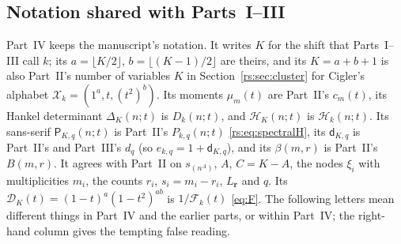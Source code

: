 \documentclass[11pt]{article}
\theoremstyle{definition}
\theoremstyle{remark}
\newcommand{\Ht}{\mathcal H}
\newcommand{\F}{\mathcal F}
\newcommand{\XX}{\mathcal X}
\newcommand{\Den}{\mathcal D}
\newcommand{\Pblock}{\mathsf P}
\newcommand{\dq}{\mathsf d}
\theoremstyle{definition}
\theoremstyle{plain}
\numberwithin{equation}{section}
\begin{document}
\subsection{Notation shared with Parts~I--III}
\label{sb:sec:notation}
Part~IV keeps the manuscript's notation. It writes $K$ for the shift that
Parts~I--III call $k$; its $a=\lfloor K/2\rfloor$, $b=\lfloor(K-1)/2\rfloor$
are theirs, and its $K=a+b+1$ is also Part~II's number of variables $K$ in
Section~\ref{rs:sec:cluster} for Cigler's alphabet $\XX_k=(1^a,t,(t^2)^b)$.
Its moments $\mu_m(t)$ are Part~II's $c_m(t)$, its Hankel determinant
$\Delta_K(n;t)$ is $D_k(n;t)$, and $\Ht_K(n;t)$ is $\Ht_k(n;t)$. Its
sans-serif $\Pblock_{K,q}(n;t)$ is Part~II's $P_{k,q}(n;t)$
\eqref{rs:eq:spectralH}, its $\dq_{K,q}$ is Part~II's and Part~III's $d_q$
(so $e_{k,q}=1+\dq_{K,q}$), and its $\beta(m,r)$ is Part~II's $B(m,r)$.
It agrees with Part~II on $s_{(n^A)}$, $A$, $C=K-A$, the nodes $\xi_i$ with
multiplicities $m_i$, the counts $r_i$, $s_i=m_i-r_i$, $L_{\boldsymbol r}$
and $q$. Its $\Den_K(t)=(1-t)^a(1-t^2)^{ab}$ is $1/\F_k(t)$ \eqref{eq:F}.
The following letters mean different things in Part~IV and the earlier
parts, or within Part~IV; the right-hand column gives the tempting false
reading.
\end{document}
